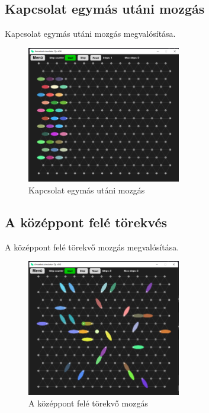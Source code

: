 \documentclass[	
  noindent
]{elteikthesis}[2024/04/26]
\begin{document}
      \subsection{Kapcsolat egymás utáni mozgás}
        Kapcsolat egymás utáni mozgás megvalósítása.
      \begin{figure}[H]
        \centering
        \includegraphics[width=0.6\textwidth]{images/simulatons/02_connected.png}
        \caption{Kapcsolat egymás utáni mozgás}
        \label{fig:01_random}
      \end{figure}

      \subsection{A középpont felé törekvés}
      A középpont felé törekvő mozgás megvalósítása.
      \begin{figure}[H]
        \centering
        \includegraphics[width=0.6\textwidth]{images/simulatons/03_center.png}
        \caption{A középpont felé törekvő mozgás }
        \label{fig:03_center}
      \end{figure}
\end{document}
